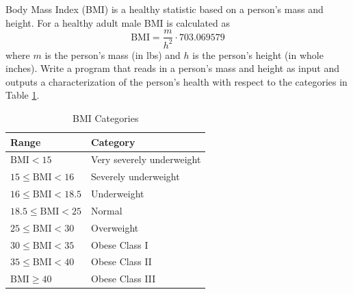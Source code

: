 \begin{exer}
Body Mass Index (BMI) is a healthy statistic based on a person's mass and height.  For a healthy adult male
BMI is calculated as 
 $$\mathrm{BMI} = \frac{m}{h^2} \cdot 703.069579$$
where $m$ is the person's mass (in lbs) and $h$ is the person's height (in whole inches).  Write a program
that reads in a person's mass and height as input and outputs a characterization of the person's health with
respect to the categories in Table \ref{table:bmiCategories}.
\begin{table}[h]
\centering
\begin{tabular}{|l|l|}
\hline
Range & Category \\
\hline
\hline
$\mathrm{BMI} < 15$ & Very severely underweight \\
\hline
$15 \leq \mathrm{BMI} < 16$ & Severely underweight \\
\hline
$16 \leq \mathrm{BMI} < 18.5$ & Underweight \\
\hline
$18.5 \leq \mathrm{BMI} < 25$ & Normal \\
\hline
$25 \leq \mathrm{BMI} < 30$ & Overweight \\
\hline
$30 \leq \mathrm{BMI} < 35$ & Obese Class I \\
\hline
$35 \leq \mathrm{BMI} < 40$ & Obese Class II \\
\hline
$\mathrm{BMI} \geq 40$ & Obese Class III \\
\hline
\end{tabular}
\caption{BMI Categories}
\label{table:bmiCategories}
\end{table}
\end{exer}

